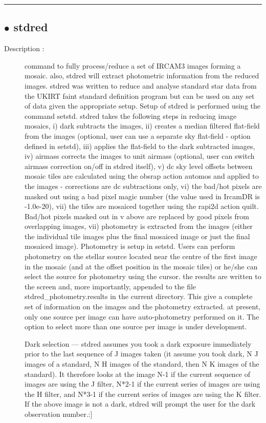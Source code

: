\hrule \subsection*{$\bullet$ stdred}
\begin{description}
\item[Description :] command to fully process/reduce a set of {\sc IRCAM3} images forming a
mosaic.  also, stdred will extract photometric information from the
reduced images.  stdred was written to reduce and analyse standard star
data from the {\sc UKIRT} faint standard definition program but can be used on
any set of data given the appropriate setup.  Setup of stdred is
performed using the command setstd.  stdred takes the following steps in
reducing image mosaics, i) dark subtracts the images, ii) creates a
median filtered flat-field from the images (optional, user can use a
separate sky flat-field - option defined in setstd), iii) applies the
flat-field to the dark subtracted images, iv) airmass corrects the images
to unit airmass (optional, user can switch airmass correction on/off in
stdred itself), v) dc sky level offsets between mosaic tiles are
calculated using the obsrap action automos and applied to the images -
corrections are dc subtractions only, vi) the bad/hot pixels are masked
out using a bad pixel magic number (the value used in IrcamDR is
-1.0e-20), vii) the tiles are mosaiced together using the rapi2d action
quilt.  Bad/hot pixels masked out in v above are replaced by good pixels
from overlapping images, vii) photometry is extracted from the images
(either the individual tile images plus the final mosaiced image or just
the final mosaiced image).  Photometry is setup in setstd.  Users can
perform photometry on the stellar source located near the centre of the
first image in the mosaic (and at the offset position in the mosaic
tiles) or he/she can select the source for photometry using the cursor.
the results are written to the screen and, more importantly, appended to
the file stdred\_photometry.results in the current directory.  This give a
complete set of information on the images and the photometry extracted.
at present, only one source per image can have auto-photometry performed
on it.  The option to select more than one source per image is under
development.

Dark selection --- stdred assumes you took a dark exposure immediately
prior to the last sequence of J images taken (it assume you took dark, N
J images of a standard, N H images of the standard, then N K images of
the standard).  It therefore looks at the image N-1 if the current
sequence of images are using the J filter, N*2-1 if the current series of
images are using the H filter, and N*3-1 if the current series of images
are using the K filter.  If the above image is not a dark, stdred will
prompt the user for the dark observation number.:]


\end{description}

